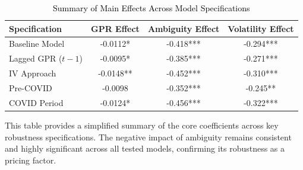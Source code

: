 \documentclass[preprint,12pt,authoryear]{elsarticle}
\begin{document}
\begin{table}[htbp]
\centering
\color{black}
\caption{\textcolor{black}{Summary of Main Effects Across Model Specifications}}
\label{tab:summary_effects}
\begin{threeparttable}
\begin{tabular*}{\textwidth}{@{\extracolsep{\fill}} lccc @{\extracolsep{\fill}}}
\toprule
Specification & GPR Effect & Ambiguity Effect & Volatility Effect \\
\midrule
Baseline Model & -0.0112* & -0.418*** & -0.294*** \\
Lagged GPR ($t-1$) & -0.0095* & -0.385*** & -0.271*** \\
IV Approach & -0.0148** & -0.452*** & -0.310*** \\
Pre-COVID & -0.0098 & -0.352*** & -0.245** \\
COVID Period & -0.0124* & -0.456*** & -0.322*** \\
\bottomrule
\end{tabular*}
\begin{tablenotes}[flushleft]
\small
\item[] This table provides a simplified summary of the core coefficients across key robustness specifications. The negative impact of ambiguity remains consistent and highly significant across all tested models, confirming its robustness as a pricing factor.
\end{tablenotes}
\end{threeparttable}
\end{table}
\end{document}
